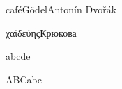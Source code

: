 \documentclass[UTF8]{ctexart}
\begin{document}
café\quad Gödel\quad Antonín Dvořák

χαϊδεύης\qquad Крюкова

\textgreek{abcde}

{\selectfont ABCabc}

\end{document}

